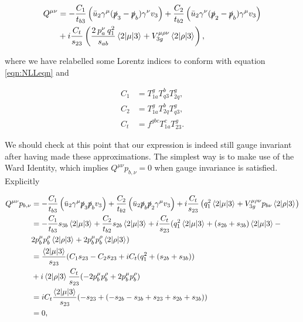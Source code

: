 \begin{equation}
\begin{split}
Q^{\mu \nu} &= -\frac{C_1}{t_{b3}} \left(\bar{u}_2 \gamma^\mu (\slashed{p}_3-\slashed{p}_b)\gamma^\nu v_3 \right) + \frac{C_2}{t_{b2}} \left( \bar{u}_2 \gamma^\nu (\slashed{p}_2-\slashed{p}_b) \gamma^\mu v_3 \right) \\
&+ i  \frac{C_t}{s_{23}} \left(\frac{2 \hspace{2pt} p_a^\nu \hspace{2pt} q_1^2}{s_{ab}}  \mathinner{\langle2\vert\mu\vert3\rangle}_{} + V^{\mu \rho \nu}_{3g}  \mathinner{\langle2\vert\rho\vert3\rangle}_{} \right),
\end{split}
\end{equation}

where we have relabelled some Lorentz indices to conform with equation \ref{eqn:NLLeqn} and

\begin{subequations}
\begin{align}
C_1 &= T^g_{1a} T^b_{q3}T^g_{2q}, \\
C_2 &= T^g_{1a} T^b_{2q}T^g_{q3}, \\
C_t &= f^{gbc}T^c_{1a}T^g_{23}.
\end{align}
\end{subequations}

We should check at this point that our expression is indeed still gauge invariant after having made these approximations. The simplest way is to make use of the Ward Identity, which implies $Q^{\mu \nu} p_{b, \nu} = 0$ when gauge invariance is satisfied. Explicitly 

\begin{equation}
\begin{split}
Q^{\mu \nu}p_{b, \nu} &= -\frac{C_1}{t_{b3}} \left(\bar{u}_2 \gamma^\mu \slashed{p}_3 \slashed{p}_b v_3 \right) + \frac{C_2}{t_{b2}} \left( \bar{u}_2 \slashed{p}_b \slashed{p}_2 \gamma^\mu v_3 \right) + i  \frac{C_t}{s_{23}} \left(q_1^2  \mathinner{\langle2\vert\mu\vert3\rangle}_{} + V^{\mu \rho \nu}_{3g}p_{b \nu}  \mathinner{\langle2\vert\rho\vert3\rangle}_{} \right) \\
&= -\frac{C_1}{t_{b3}} s_{3b} \mathinner{\langle2\vert\mu\vert3\rangle}_{} + \frac{C_2}{t_{b2}} s_{2b} \mathinner{\langle2\vert\mu\vert3\rangle}_{} + i \frac{C_t}{s_{23}}(q_1^2 \mathinner{\langle2\vert\mu\vert3\rangle}_{} + (s_{2b} + s_{3b})\mathinner{\langle2\vert\mu\vert3\rangle}_{} - \\
&2p_b^\mu p_b^\rho\mathinner{\langle2\vert\rho\vert3\rangle}_{} + 2p_b^\mu p_b^\rho \mathinner{\langle2\vert\rho\vert3\rangle}_{}) \\
&= \frac{\mathinner{\langle2\vert\mu\vert3\rangle}_{}}{s_{23}}(C_1 s_{23} - C_2 s_{23} + i C_t(q_1^2 + (s_{2b} + s_{3b})) \\
&+ i\mathinner{\langle2\vert\rho\vert3\rangle}_{} \frac{C_t}{s_{23}}(-2p_b^\mu p_b^\rho + 2p_b^\mu p_b^\rho) \\
&= i C_t \frac{\mathinner{\langle2\vert\mu\vert3\rangle}_{}}{s_{23}}(-s_{23} + (-s_{2b} - s_{3b} + s_{23} + s_{2b} + s_{3b})) \\
&= 0,
\end{split}
\end{equation}

